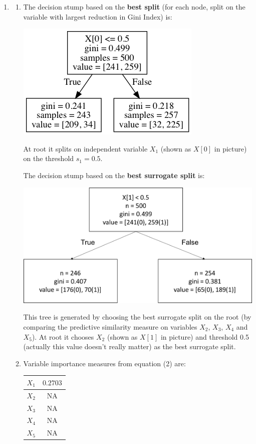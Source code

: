 \documentclass[paper=letter, fontsize=12pt]{article}
\begin{document}
\begin{enumerate}[label=(\alph*)]
	\item 
	\begin{enumerate}[label=(\roman*)]
		\item 
		The decision stump based on the \textbf{best split} (for each node, split on the variable with largest reduction in Gini Index) is:
		
		\includegraphics[scale=0.6]{tree_best_split.png}
		
		At root it splits on independent variable $X_1$ (shown as $X[0]$ in picture) on the threshold $s_1 = 0.5$.
		
		The decision stump based on the \textbf{best surrogate split} is:
		
		\includegraphics[scale=0.4]{tree_best_surrogate_split.png}
		
		This tree is generated by choosing the best surrogate split on the root (by comparing the predictive similarity measure on variables $X_2$, $X_3$, $X_4$ and $X_5$). At root it chooses $X_2$ (shown as $X[1]$ in picture) and threshold 0.5 (actually this value doesn't really matter) as the best surrogate split.
		
		\item Variable importance measures from equation (2) are:
		
		\begin{center}
			\begin{tabular}{|c|c|}
				\hline
				$X_1$ & $0.2703$ \\ \hline
				$X_2$ & NA \\ \hline
				$X_3$ & NA \\ \hline
				$X_4$ & NA \\ \hline
				$X_5$ & NA \\ \hline
			\end{tabular}
		\end{center}
			

\end{enumerate}
\end{enumerate}
\end{document}
